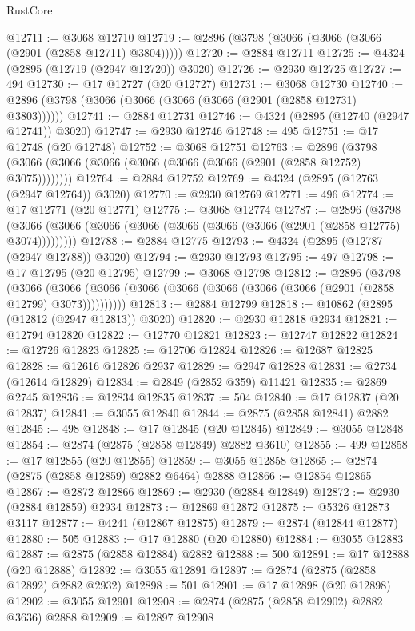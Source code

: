\begin{lexlean}{RustCore}
\begin{coremodule}
@12711 := @3068 @12710
@12719 := @2896 (@3798 (@3066 (@3066 (@3066 (@2901 (@2858 @12711) @3804)))))
@12720 := @2884 @12711
@12725 := @4324 (@2895 (@12719 (@2947 @12720)) @3020)
@12726 := @2930 @12725
@12727 := 494
@12730 := @17 @12727 (@20 @12727)
@12731 := @3068 @12730
@12740 := @2896 (@3798 (@3066 (@3066 (@3066 (@3066 (@2901 (@2858 @12731) @3803))))))
@12741 := @2884 @12731
@12746 := @4324 (@2895 (@12740 (@2947 @12741)) @3020)
@12747 := @2930 @12746
@12748 := 495
@12751 := @17 @12748 (@20 @12748)
@12752 := @3068 @12751
@12763 := @2896 (@3798 (@3066 (@3066 (@3066 (@3066 (@3066 (@3066 (@2901 (@2858 @12752) @3075))))))))
@12764 := @2884 @12752
@12769 := @4324 (@2895 (@12763 (@2947 @12764)) @3020)
@12770 := @2930 @12769
@12771 := 496
@12774 := @17 @12771 (@20 @12771)
@12775 := @3068 @12774
@12787 := @2896
    (@3798 (@3066 (@3066 (@3066 (@3066 (@3066 (@3066 (@3066 (@2901 (@2858 @12775) @3074)))))))))
@12788 := @2884 @12775
@12793 := @4324 (@2895 (@12787 (@2947 @12788)) @3020)
@12794 := @2930 @12793
@12795 := 497
@12798 := @17 @12795 (@20 @12795)
@12799 := @3068 @12798
@12812 := @2896
    (@3798
      (@3066 (@3066 (@3066 (@3066 (@3066 (@3066 (@3066 (@3066 (@2901 (@2858 @12799) @3073))))))))))
@12813 := @2884 @12799
@12818 := @10862 (@2895 (@12812 (@2947 @12813)) @3020)
@12820 := @2930 @12818 @2934
@12821 := @12794 @12820
@12822 := @12770 @12821
@12823 := @12747 @12822
@12824 := @12726 @12823
@12825 := @12706 @12824
@12826 := @12687 @12825
@12828 := @12616 @12826 @2937
@12829 := @2947 @12828
@12831 := @2734 (@12614 @12829)
@12834 := @2849 (@2852 @359) @11421
@12835 := @2869 @2745
@12836 := @12834 @12835
@12837 := 504
@12840 := @17 @12837 (@20 @12837)
@12841 := @3055 @12840
@12844 := @2875 (@2858 @12841) @2882
@12845 := 498
@12848 := @17 @12845 (@20 @12845)
@12849 := @3055 @12848
@12854 := @2874 (@2875 (@2858 @12849) @2882 @3610)
@12855 := 499
@12858 := @17 @12855 (@20 @12855)
@12859 := @3055 @12858
@12865 := @2874 (@2875 (@2858 @12859) @2882 @6464) @2888
@12866 := @12854 @12865
@12867 := @2872 @12866
@12869 := @2930 (@2884 @12849)
@12872 := @2930 (@2884 @12859) @2934
@12873 := @12869 @12872
@12875 := @5326 @12873 @3117
@12877 := @4241 (@12867 @12875)
@12879 := @2874 (@12844 @12877)
@12880 := 505
@12883 := @17 @12880 (@20 @12880)
@12884 := @3055 @12883
@12887 := @2875 (@2858 @12884) @2882
@12888 := 500
@12891 := @17 @12888 (@20 @12888)
@12892 := @3055 @12891
@12897 := @2874 (@2875 (@2858 @12892) @2882 @2932)
@12898 := 501
@12901 := @17 @12898 (@20 @12898)
@12902 := @3055 @12901
@12908 := @2874 (@2875 (@2858 @12902) @2882 @3636) @2888
@12909 := @12897 @12908

\end{coremodule}
\end{lexlean}
